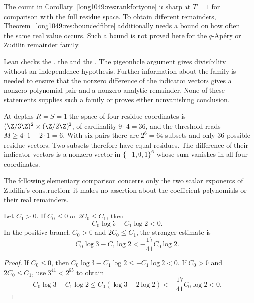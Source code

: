 The count in Corollary~\ref{long1049:res:rankfortyone} is sharp at
$T=1$ for comparison with the full residue space. To obtain different
remainders, Theorem~\ref{long1049:res:boundedfibre} additionally needs
a bound on how often the same real value occurs. Such a bound is not
proved here for the $q$-Ap\'ery or Zudilin remainder family.

\noindent Lean checks the
, the
 and the
. The pigeonhole argument gives
divisibility without an independence hypothesis. Further information
about the family is needed to ensure that the nonzero difference of the
indicator vectors gives a nonzero polynomial pair and a nonzero analytic
remainder. None of these statements supplies such a family or proves
either nonvanishing conclusion.

\begin{example}\label{long1049:ex:jetcount}
At depths \(R=S=1\) the space of four residue coordinates is
\((\Z/3\Z)^2\times(\Z/2\Z)^2\), of cardinality \(9\cdot4=36\), and the threshold
reads \(M\ge4\cdot1+2\cdot1=6\). With six pairs there are \(2^{6}=64\)
subsets and only \(36\) possible residue vectors. Two subsets therefore
have equal residues. The difference of their indicator vectors is a
nonzero vector in \(\{-1,0,1\}^{6}\) whose sum vanishes in all four coordinates.
\end{example}

The following elementary comparison concerns only the two scalar
exponents of Zudilin's construction; it makes no assertion about
the coefficient polynomials or their real remainders.

\begin{theorem}\label{long1049:res:scalar}
Let \(C_1>0\).  If \(C_0\le0\) or \(2C_0\le C_1\), then
\[
 C_0\log 3-C_1\log 2<0.
\]
In the positive branch $C_0>0$ and $2C_0\le C_1$, the stronger estimate is
\[
 C_0\log3-C_1\log2< -\frac{17}{41}C_0\log2.
\]
\end{theorem}

\begin{proof}
If $C_0\le0$, then $C_0\log3-C_1\log2\le-C_1\log2<0$.
If $C_0>0$ and $2C_0\le C_1$, use $3^{41}<2^{65}$ to obtain
\[
 C_0\log3-C_1\log2
 \le C_0(\log3-2\log2)
 <-\frac{17}{41}C_0\log2<0.
\]
\end{proof}

